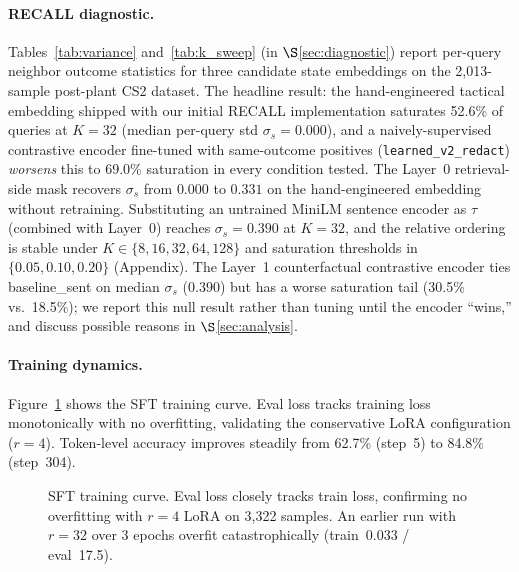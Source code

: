 \documentclass{article}
\begin{document}
\paragraph{RECALL diagnostic.} Tables~\ref{tab:variance} and~\ref{tab:k_sweep} (in $\S$\ref{sec:diagnostic}) report per-query neighbor outcome statistics for three candidate state embeddings on the 2{,}013-sample post-plant CS2 dataset. The headline result: the hand-engineered tactical embedding shipped with our initial RECALL implementation saturates 52.6\% of queries at $K{=}32$ (median per-query std $\sigma_s = 0.000$), and a naively-supervised contrastive encoder fine-tuned with same-outcome positives (\texttt{learned\_v2\_redact}) \emph{worsens} this to 69.0\% saturation in every condition tested. The Layer~0 retrieval-side mask recovers $\sigma_s$ from $0.000$ to $0.331$ on the hand-engineered embedding without retraining. Substituting an untrained MiniLM sentence encoder as $\tau$ (combined with Layer~0) reaches $\sigma_s = 0.390$ at $K{=}32$, and the relative ordering is stable under $K \in \{8, 16, 32, 64, 128\}$ and saturation thresholds in $\{0.05, 0.10, 0.20\}$ (Appendix). The Layer~1 counterfactual contrastive encoder ties baseline\_sent on median $\sigma_s$ ($0.390$) but has a worse saturation tail (30.5\% vs.\ 18.5\%); we report this null result rather than tuning until the encoder ``wins,'' and discuss possible reasons in $\S$\ref{sec:analysis}.

\paragraph{Training dynamics.} Figure~\ref{fig:sft_curve} shows the SFT training curve. Eval loss tracks training loss monotonically with no overfitting, validating the conservative LoRA configuration ($r{=}4$). Token-level accuracy improves steadily from 62.7\% (step~5) to 84.8\% (step~304).

\begin{figure}[t]
\centering
{}
\caption{SFT training curve. Eval loss closely tracks train loss, confirming no overfitting with $r{=}4$ LoRA on 3{,}322 samples. An earlier run with $r{=}32$ over 3 epochs overfit catastrophically (train~0.033 / eval~17.5).}
\label{fig:sft_curve}
\end{figure}
\end{document}
